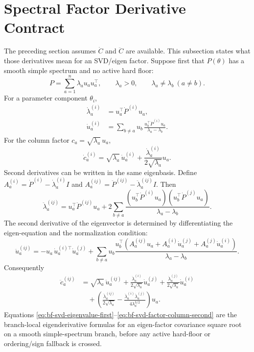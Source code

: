 \section{Spectral Factor Derivative Contract}
\label{sec:bf-svd-factor-derivative-contract}

The preceding section assumes $\dot C$ and $\ddot C$ are available.  This
subsection states what those derivatives mean for an SVD/eigen factor.  Suppose
first that $P(\theta)$ has a smooth simple spectrum and no active hard floor:
\[
  P=\sum_{a=1}^n \lambda_a u_au_a^\top,\qquad
  \lambda_a>0,\qquad \lambda_a\ne\lambda_b\ (a\ne b).
\]
For a parameter component $\theta_i$,
\begin{align}
\label{eq:bf-svd-eigenvalue-first}
  \dot\lambda_a^{(i)}
  &=u_a^\top\dot P^{(i)}u_a,\\
\label{eq:bf-svd-eigenvector-first}
  \dot u_a^{(i)}
  &=
  \sum_{b\ne a}
  u_b\,
  \frac{u_b^\top\dot P^{(i)}u_a}{\lambda_a-\lambda_b}.
\end{align}
For the column factor $c_a=\sqrt{\lambda_a}\,u_a$,
\begin{equation}
\label{eq:bf-svd-factor-column-first}
  \dot c_a^{(i)}
  =
  \sqrt{\lambda_a}\,\dot u_a^{(i)}
  +\frac{\dot\lambda_a^{(i)}}{2\sqrt{\lambda_a}}u_a .
\end{equation}
Second derivatives can be written in the same eigenbasis.  Define
$A_a^{(i)}=\dot P^{(i)}-\dot\lambda_a^{(i)}I$ and
$A_a^{(ij)}=\ddot P^{(ij)}-\ddot\lambda_a^{(ij)}I$.  Then
\begin{equation}
\label{eq:bf-svd-eigenvalue-second}
  \ddot\lambda_a^{(ij)}
  =
  u_a^\top\ddot P^{(ij)}u_a
  +2\sum_{b\ne a}
    \frac{
      (u_b^\top\dot P^{(i)}u_a)
      (u_b^\top\dot P^{(j)}u_a)
    }{\lambda_a-\lambda_b}.
\end{equation}
The second derivative of the eigenvector is determined by differentiating the
eigen-equation and the normalization condition:
\begin{equation}
\label{eq:bf-svd-eigenvector-second}
  \ddot u_a^{(ij)}
  =
  -u_a\,\dot u_a^{(i)\top}\dot u_a^{(j)}
  +\sum_{b\ne a}u_b
  \frac{
    u_b^\top
    \left(
      A_a^{(ij)}u_a
      +A_a^{(i)}\dot u_a^{(j)}
      +A_a^{(j)}\dot u_a^{(i)}
    \right)
  }{\lambda_a-\lambda_b}.
\end{equation}
Consequently
\begin{align}
\label{eq:bf-svd-factor-column-second}
  \ddot c_a^{(ij)}
  &=
  \sqrt{\lambda_a}\,\ddot u_a^{(ij)}
  +\frac{\dot\lambda_a^{(i)}}{2\sqrt{\lambda_a}}\dot u_a^{(j)}
  +\frac{\dot\lambda_a^{(j)}}{2\sqrt{\lambda_a}}\dot u_a^{(i)}
  \nonumber\\
  &\quad
  +\left(
      \frac{\ddot\lambda_a^{(ij)}}{2\sqrt{\lambda_a}}
      -\frac{\dot\lambda_a^{(i)}\dot\lambda_a^{(j)}}{4\lambda_a^{3/2}}
    \right)u_a .
\end{align}
Equations
\eqref{eq:bf-svd-eigenvalue-first}--\eqref{eq:bf-svd-factor-column-second}
are the branch-local eigenderivative formulas for an eigen-factor covariance
square root on a smooth simple-spectrum branch, before any active hard-floor
or ordering/sign fallback is crossed.

